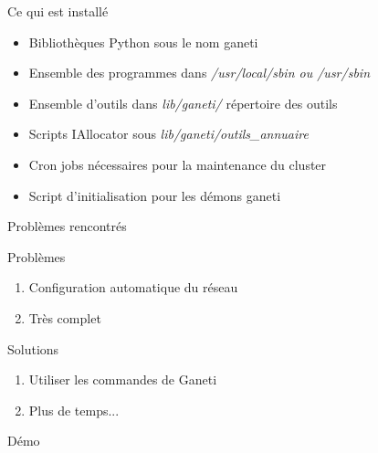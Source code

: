 \begin{frame}{Ce qui est installé}
\begin{itemize}
\item Bibliothèques Python sous le nom ganeti
\pause
\item Ensemble des programmes dans \emph{/usr/local/sbin ou /usr/sbin}
\pause
\item Ensemble d'outils dans \emph{lib/ganeti/} répertoire des outils
\pause
\item Scripts IAllocator sous \emph{lib/ganeti/outils\_annuaire}
\pause
\item Cron jobs nécessaires pour la maintenance du cluster
\pause
\item Script d'initialisation pour les démons ganeti
\end{itemize}
\end{frame}

\begin{frame}{Problèmes rencontrés}
 \begin{alertblock}{Problèmes}
   \begin{enumerate}
     \item Configuration automatique du réseau
       \pause
     \item Très complet
       \pause
   \end{enumerate}
 \end{alertblock}
\pause
 \begin{exampleblock}{Solutions}
   \begin{enumerate}
     \item Utiliser les commandes de Ganeti
       \pause
     \item Plus de temps...
   \end{enumerate}
 \end{exampleblock}
\end{frame}

\begin{frame}
  \begin{center}
   \huge{Démo}
  \end{center}
\end{frame}

%
